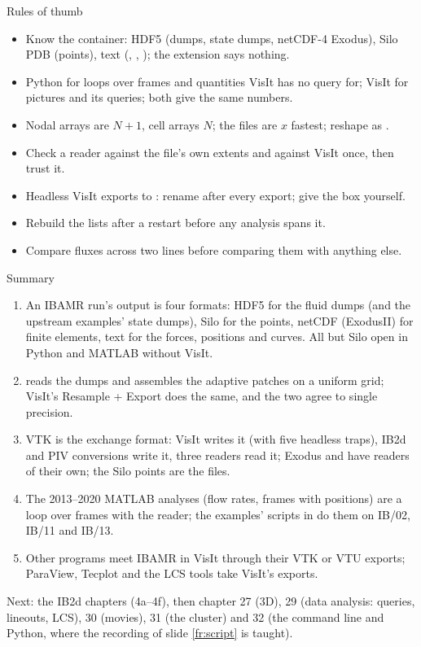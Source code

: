 \documentclass[aspectratio=169,11pt]{beamer}
\begin{document}
\begin{frame}{Rules of thumb}
\label{fr:thumb}
\small
\begin{itemize}
  \item Know the container: HDF5 (dumps, state dumps, netCDF-4 Exodus), Silo PDB (points), text (, , ); the extension says nothing.
  \item Python for loops over frames and quantities VisIt has no query for; VisIt for pictures and its queries; both give the same numbers.
  \item Nodal arrays are $N + 1$, cell arrays $N$; the files are $x$ fastest; reshape as .
  \item Check a reader against the file's own extents and against VisIt once, then trust it.
  \item Headless VisIt exports to : rename after every export; give the box yourself.
  \item Rebuild the  lists after a restart before any analysis spans it.
  \item Compare fluxes across two lines before comparing them with anything else.
\end{itemize}
\end{frame}

\begin{frame}{Summary}
\label{fr:wrapup}
\footnotesize
\begin{enumerate}
  \item An IBAMR run's output is four formats: HDF5 for the fluid dumps (and the upstream examples' state dumps), Silo for the points, netCDF (ExodusII) for finite elements, text for the forces, positions and curves. All but Silo open in Python and MATLAB without VisIt.
  \item {} reads the dumps and assembles the adaptive patches on a uniform grid; VisIt's Resample + Export does the same, and the two agree to single precision.
  \item VTK is the exchange format: VisIt writes it (with five headless traps), IB2d and PIV conversions write it, three readers read it; Exodus and  have readers of their own; the Silo points are the  files.
  \item The 2013--2020 MATLAB analyses (flow rates, frames with positions) are a loop over frames with the reader; the examples' scripts in  do them on IB/02, IB/11 and IB/13.
  \item Other programs meet IBAMR in VisIt through their VTK or VTU exports; ParaView, Tecplot and the LCS tools take VisIt's exports.
\end{enumerate}
\begin{homebox}
\footnotesize Next: the IB2d chapters (4a--4f), then chapter 27 (3D), 29 (data analysis: queries, lineouts, LCS), 30 (movies), 31 (the cluster) and 32 (the command line and Python, where the recording of slide \ref{fr:script} is taught).
\end{homebox}
\end{frame}
\end{document}
